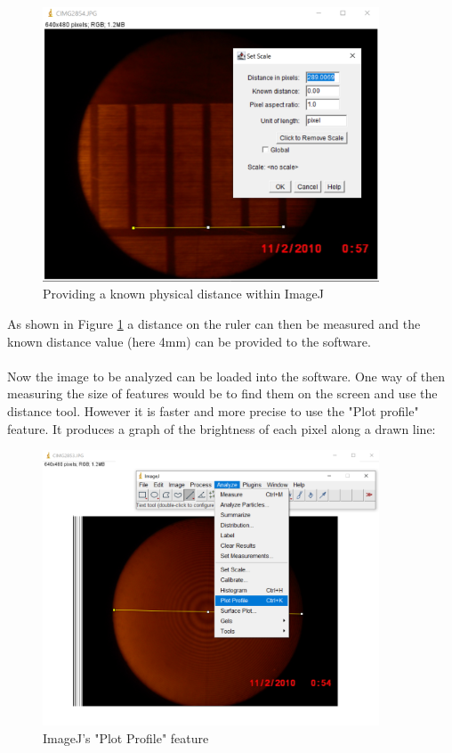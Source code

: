 \documentclass[12pt]{article}
\begin{document}
\begin{figure}[H]
  \centering
  \includegraphics[width=10cm]{./images/imagej_measure_ruler.png}
  \caption{Providing a known physical distance within ImageJ}
  \label{fig:imagej_provide_ditance}
\end{figure}

As shown in Figure \ref{fig:imagej_provide_ditance} a distance on the ruler can then be measured and
the known distance value (here 4mm) can be provided to the software.\\
\\
Now the image to be analyzed can be loaded into the software. One way of then measuring the size
of features would be to find them on the screen and use the distance tool. However it is faster
and more precise to use the "Plot profile" feature. It produces a graph of the brightness of each
pixel along a drawn line:

\begin{figure}[H]
  \centering
  \includegraphics[width=10cm]{./images/imagej_plot_profile.png}
  \caption{ImageJ's "Plot Profile" feature}
  \label{fig:imagej_plot_profile}
\end{figure}
\end{document}
